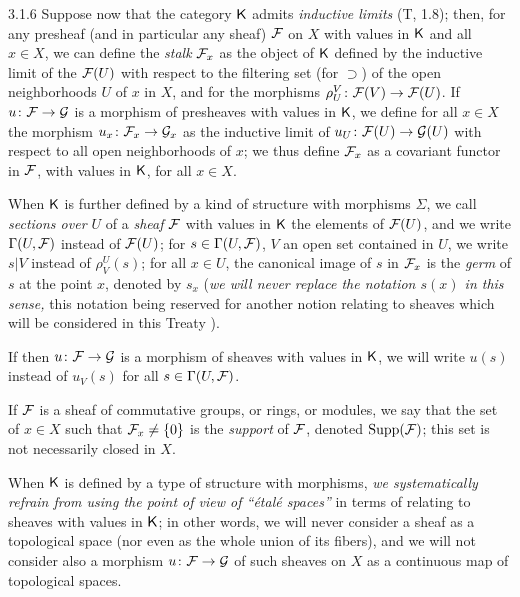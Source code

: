 \documentclass[../main.tex]{subfiles}
\begin{document}
\begin{env}{3.1.6}
Suppose now that the category $\mathsf{K}$ admits \emph{inductive limits} (T, 1.8);
then, for any presheaf (and in particular any sheaf) $\mathcal{F}$ on $X$ with
values in $\mathsf{K}$ and all $x\in X$, we can define the \emph{stalk} $\mathcal{F}_x$ as the object of $\mathsf{K}$ defined
by the inductive limit of the $\mathcal{F}(U)$ with respect to the filtering set
(for $\supset$) of the open neighborhoods $U$ of $x$ in $X$, and for the morphisms $\rho_U^V\colon\mathcal{F}(V)\to\mathcal{F}(U)$.
If $u\colon\mathcal{F}\to\mathcal{G}$ is a morphism of presheaves with values in $\mathsf{K}$, we define for all
$x\in X$ the morphism $u_x\colon\mathcal{F}_x\to\mathcal{G}_x$ as the inductive limit of $u_U\colon\mathcal{F}(U)\to\mathcal{G}(U)$ with respect to all
open neighborhoods of $x$; we thus define $\mathcal{F}_x$ as a covariant functor in $\mathcal{F}$, with values in $\mathsf{K}$, for
all $x\in X$.

When $\mathsf{K}$ is further defined by a kind of structure with morphisms $\Sigma$,
we call \emph{sections over $U$} of a \emph{sheaf} $\mathcal{F}$ with values in $\mathsf{K}$ the elements
of $\mathcal{F}(U)$, and we write $\Gamma(U,\mathcal{F})$ instead of $\mathcal{F}(U)$; for $s\in\Gamma(U,\mathcal{F})$, $V$ an open set
contained in $U$, we write $s|V$ instead of $\rho_V^U(s)$; for all $x\in U$, the canonical image
of $s$ in $\mathcal{F}_x$ is the \emph{germ} of $s$ at the point $x$, denoted by $s_x$ (\emph{we will never replace
the notation $s(x)$ in this sense,} this notation being reserved for another notion relating to sheaves
which will be considered in this Treaty ).

If then $u\colon\mathcal{F}\to\mathcal{G}$ is a morphism of sheaves with values in $\mathsf{K}$, we will write $u(s)$
instead of $u_V(s)$ for all $s\in\Gamma(U,\mathcal{F})$.

If $\mathcal{F}$ is a sheaf of commutative groups, or rings, or modules, we say
that the set of $x\in X$ such that $\mathcal{F}_x\neq\{0\}$ is the \emph{support} of $\mathcal{F}$, denoted
$\operatorname{Supp}(\mathcal{F})$; this set is not necessarily closed in $X$.

When $\mathsf{K}$ is defined by a type of structure with morphisms, \emph{we
systematically refrain from using the point of view of ``{\'e}tal{\'e} spaces''} in terms of
relating to sheaves with values in $\mathsf{K}$; in other words, we will never consider
a sheaf as a topological space (nor even as the whole union of its
fibers), and we will not consider also a morphism $u\colon\mathcal{F}\to\mathcal{G}$ of such sheaves
on $X$ as a continuous map of topological spaces.
\end{env}
\end{document}

